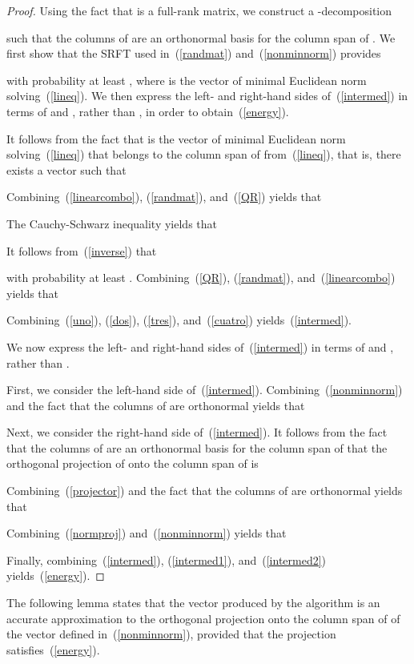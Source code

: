 \documentclass[letterpaper,12pt]{article}
\begin{document}
\begin{proof}
Using the fact that  is a full-rank matrix,
we construct a -decomposition

such that the columns of  are an orthonormal basis
for the column span of .
We first show that the SRFT  used
in~(\ref{randmat}) and~(\ref{nonminnorm}) provides

with probability at least ,
where  is the vector of minimal Euclidean norm
solving~(\ref{lineq}).
We then express the left- and right-hand sides of~(\ref{intermed})
in terms of  and ,
rather than , in order to obtain~(\ref{energy}).

It follows from the fact that  is the vector
of minimal Euclidean norm solving~(\ref{lineq})
that  belongs to the column span
of  from~(\ref{lineq}), that is,
there exists a vector  such that

Combining~(\ref{linearcombo}), (\ref{randmat}), and~(\ref{QR}) yields that

The Cauchy-Schwarz inequality yields that

It follows from~(\ref{inverse}) that

with probability at least .
Combining~(\ref{QR}), (\ref{randmat}), and~(\ref{linearcombo}) yields that

Combining~(\ref{uno}), (\ref{dos}), (\ref{tres}), and~(\ref{cuatro})
yields~(\ref{intermed}).

We now express the left- and right-hand sides of~(\ref{intermed})
in terms of  and ,
rather than .

First, we consider the left-hand side of~(\ref{intermed}).
Combining~(\ref{nonminnorm}) and the fact that the columns
of  are orthonormal yields that


Next, we consider the right-hand side of~(\ref{intermed}).
It follows from the fact that the columns of 
are an orthonormal basis for the column span of 
that the orthogonal projection 
of  onto the column span of  is

Combining~(\ref{projector}) and the fact that the columns
of  are orthonormal yields that

Combining~(\ref{normproj}) and~(\ref{nonminnorm}) yields that


Finally, combining~(\ref{intermed}), (\ref{intermed1}), and~(\ref{intermed2})
yields~(\ref{energy}).
\end{proof}


The following lemma states that the vector 
produced by the algorithm is an accurate approximation
to the orthogonal projection onto the column span of 
of the vector  defined in~(\ref{nonminnorm}),
provided that the projection  satisfies~(\ref{energy}).
\end{document}
